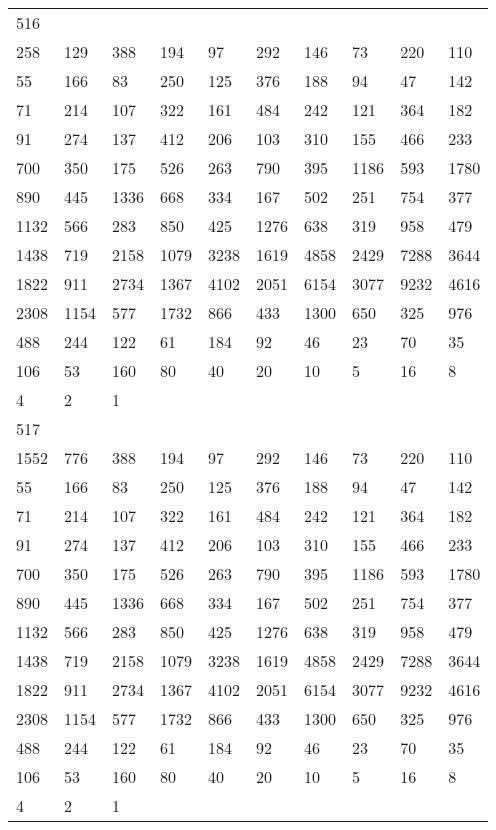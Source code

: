\begin{longtable}{*{10}{l}}
516&&&&&&&&&\\
258& 129& 388& 194& 97& 292& 146& 73& 220& 110\\
55& 166& 83& 250& 125& 376& 188& 94& 47& 142\\
71& 214& 107& 322& 161& 484& 242& 121& 364& 182\\
91& 274& 137& 412& 206& 103& 310& 155& 466& 233\\
700& 350& 175& 526& 263& 790& 395& 1186& 593& 1780\\
890& 445& 1336& 668& 334& 167& 502& 251& 754& 377\\
1132& 566& 283& 850& 425& 1276& 638& 319& 958& 479\\
1438& 719& 2158& 1079& 3238& 1619& 4858& 2429& 7288& 3644\\
1822& 911& 2734& 1367& 4102& 2051& 6154& 3077& 9232& 4616\\
2308& 1154& 577& 1732& 866& 433& 1300& 650& 325& 976\\
488& 244& 122& 61& 184& 92& 46& 23& 70& 35\\
106& 53& 160& 80& 40& 20& 10& 5& 16& 8\\
4& 2& 1& \\

517&&&&&&&&&\\
1552& 776& 388& 194& 97& 292& 146& 73& 220& 110\\
55& 166& 83& 250& 125& 376& 188& 94& 47& 142\\
71& 214& 107& 322& 161& 484& 242& 121& 364& 182\\
91& 274& 137& 412& 206& 103& 310& 155& 466& 233\\
700& 350& 175& 526& 263& 790& 395& 1186& 593& 1780\\
890& 445& 1336& 668& 334& 167& 502& 251& 754& 377\\
1132& 566& 283& 850& 425& 1276& 638& 319& 958& 479\\
1438& 719& 2158& 1079& 3238& 1619& 4858& 2429& 7288& 3644\\
1822& 911& 2734& 1367& 4102& 2051& 6154& 3077& 9232& 4616\\
2308& 1154& 577& 1732& 866& 433& 1300& 650& 325& 976\\
488& 244& 122& 61& 184& 92& 46& 23& 70& 35\\
106& 53& 160& 80& 40& 20& 10& 5& 16& 8\\
4& 2& 1& \\


\end{longtable}
